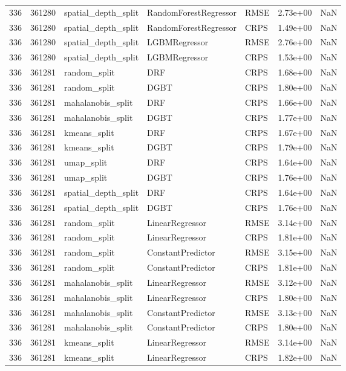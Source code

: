 \begin{tabular}{rrlllrr}
336 & 361280 & spatial\_depth\_split & RandomForestRegressor & RMSE & 2.73e+00 & NaN \\
336 & 361280 & spatial\_depth\_split & RandomForestRegressor & CRPS & 1.49e+00 & NaN \\
336 & 361280 & spatial\_depth\_split & LGBMRegressor & RMSE & 2.76e+00 & NaN \\
336 & 361280 & spatial\_depth\_split & LGBMRegressor & CRPS & 1.53e+00 & NaN \\
336 & 361281 & random\_split & DRF & CRPS & 1.68e+00 & NaN \\
336 & 361281 & random\_split & DGBT & CRPS & 1.80e+00 & NaN \\
336 & 361281 & mahalanobis\_split & DRF & CRPS & 1.66e+00 & NaN \\
336 & 361281 & mahalanobis\_split & DGBT & CRPS & 1.77e+00 & NaN \\
336 & 361281 & kmeans\_split & DRF & CRPS & 1.67e+00 & NaN \\
336 & 361281 & kmeans\_split & DGBT & CRPS & 1.79e+00 & NaN \\
336 & 361281 & umap\_split & DRF & CRPS & 1.64e+00 & NaN \\
336 & 361281 & umap\_split & DGBT & CRPS & 1.76e+00 & NaN \\
336 & 361281 & spatial\_depth\_split & DRF & CRPS & 1.64e+00 & NaN \\
336 & 361281 & spatial\_depth\_split & DGBT & CRPS & 1.76e+00 & NaN \\
336 & 361281 & random\_split & LinearRegressor & RMSE & 3.14e+00 & NaN \\
336 & 361281 & random\_split & LinearRegressor & CRPS & 1.81e+00 & NaN \\
336 & 361281 & random\_split & ConstantPredictor & RMSE & 3.15e+00 & NaN \\
336 & 361281 & random\_split & ConstantPredictor & CRPS & 1.81e+00 & NaN \\
336 & 361281 & mahalanobis\_split & LinearRegressor & RMSE & 3.12e+00 & NaN \\
336 & 361281 & mahalanobis\_split & LinearRegressor & CRPS & 1.80e+00 & NaN \\
336 & 361281 & mahalanobis\_split & ConstantPredictor & RMSE & 3.13e+00 & NaN \\
336 & 361281 & mahalanobis\_split & ConstantPredictor & CRPS & 1.80e+00 & NaN \\
336 & 361281 & kmeans\_split & LinearRegressor & RMSE & 3.14e+00 & NaN \\
336 & 361281 & kmeans\_split & LinearRegressor & CRPS & 1.82e+00 & NaN \\

\end{tabular}
